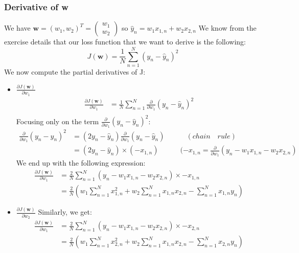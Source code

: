 \documentclass{article}
\begin{document}
\subsubsection{Derivative of w}
We have $\mathbf{w} = (w_1,w_2)^T = \begin{pmatrix}w_1\\w_2\end{pmatrix}$ so $\hat{y}_n=w_1x_{1,n}+w_2x_{2,n}$
\newline We know from the exercise details that our loss function that we want to derive is the following:
\[
J(\mathbf{w}) = \frac{1}{N}\sum\limits_{n=1}^{N}(y_n-\hat{y}_n)^2
\]
\newline We now compute the partial derivatives of J:
\begin{itemize}
\item $\frac{\partial J(\mathbf{w})}{\partial w_1}$
\[
\begin{split}
\frac{\partial J(\mathbf{w})}{\partial w_1} & = \frac{1}{N}\sum\limits_{n=1}^{N}\frac{\partial}{\partial w_1}(y_n-\hat{y}_n)^2 \\
\end{split}
\]
Focusing only on the term $\frac{\partial}{\partial w_1}(y_n-\hat{y}_n)^2$:
\[
\begin{split}
\frac{\partial}{\partial w_1}(y_n-\hat{y}_n)^2 & = (2y_n-\hat{y}_n)\frac{\partial}{\partial w_1}(y_n-\hat{y}_n) \quad\quad\quad (chain \quad rule) \\
& = (2y_n-\hat{y}_n)\times (-x_{1,n}) \quad\quad\quad (-x_{1,n} = \frac{\partial}{\partial w_1}(y_n-w_1x_{1,n}-w_2x_{2,n})
\end{split}
\]
We end up with the following expression:
\[
\begin{split}
\frac{\partial J(\mathbf{w})}{\partial w_1} & = \frac{2}{N}\sum\limits_{n=1}^{N}(y_n-w_1x_{1,n}-w_2x_{2,n})\times -x_{1,n} \\
& = \frac{2}{N}(w_1\sum\limits_{n=1}^{N}x_{1,n}^2+w_2\sum\limits_{n=1}^{N}x_{1,n}x_{2,n}-\sum\limits_{n=1}^{N}x_{1,n}y_{n})
\end{split}
\]
\item $\frac{\partial J(\mathbf{w})}{\partial w_2}$
Similarly, we get:
\[
\begin{split}
\frac{\partial J(\mathbf{w})}{\partial w_1} & = \frac{2}{N}\sum\limits_{n=1}^{N}(y_n-w_1x_{1,n}-w_2x_{2,n})\times -x_{2,n} \\
& = \frac{2}{N}(w_1\sum\limits_{n=1}^{N}x_{2,n}^2+w_2\sum\limits_{n=1}^{N}x_{1,n}x_{2,n}-\sum\limits_{n=1}^{N}x_{2,n}y_{n})
\end{split}
\]
\end{itemize}
\end{document}
